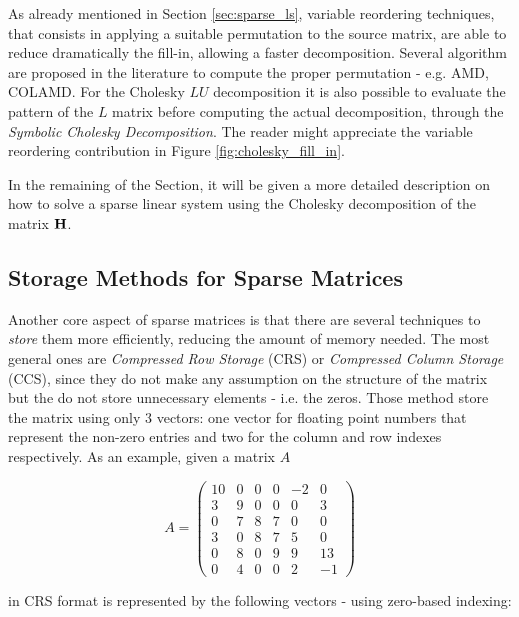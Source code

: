 As already mentioned in Section \ref{sec:sparse_ls}, variable reordering techniques, that consists in applying a suitable permutation to the source matrix, are able to reduce dramatically the fill-in, allowing a faster decomposition. Several algorithm are proposed in the literature to compute the proper permutation - e.g. AMD, COLAMD. For the Cholesky $LU$ decomposition it is also possible to evaluate the pattern of the $L$ matrix before computing the actual decomposition, through the \textit{Symbolic Cholesky Decomposition}. The reader might appreciate the variable reordering contribution in Figure \ref{fig:cholesky_fill_in}.

In the remaining of the Section, it will be given a more detailed description on how to solve a sparse linear system using the Cholesky decomposition of the matrix $\mathbf{H}$.

\subsection{Storage Methods for Sparse Matrices}\label{subsec:sparse_storage_methods}
Another core aspect of sparse matrices is that there are several techniques to \textit{store} them more efficiently, reducing the amount of memory needed. The most general ones are \textit{Compressed Row Storage} (CRS) or \textit{Compressed Column Storage} (CCS), since they do not make any assumption on the structure of the matrix but the do not store unnecessary elements - i.e. the zeros. Those method store the matrix using only 3 vectors: one vector for floating point numbers that represent the non-zero entries and two for the column and row indexes respectively. As an example, given a matrix $A$

\begin{equation*}
    A = 
        \begin{pmatrix}
            10 & 0 & 0 & 0 & -2 & 0 \\
            3 & 9 & 0 & 0 & 0 & 3 \\
            0 & 7 & 8 & 7 & 0 & 0 \\
            3 & 0 & 8 & 7 & 5 & 0 \\
            0 & 8 & 0 & 9 & 9 & 13 \\
            0 & 4 & 0 & 0 & 2 & -1 
        \end{pmatrix}
\end{equation*}

\noindent in CRS format is represented by the following vectors - using zero-based indexing:

